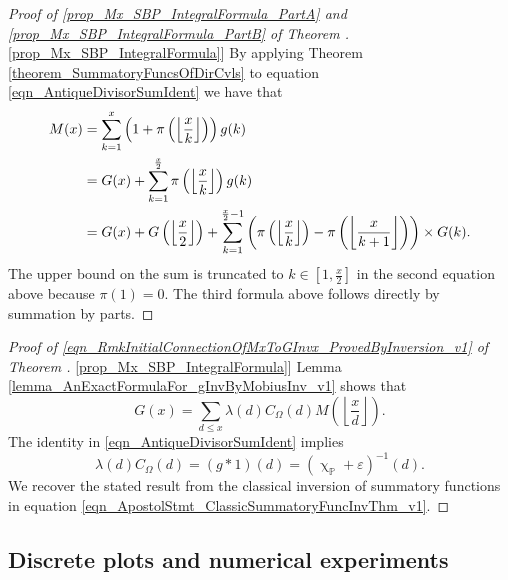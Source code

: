 \documentclass[11pt,reqno,a4letter]{article}
\newcommand{\hlocalref}[1]{\hyperref[#1]{\ref{#1}}}
\numberwithin{equation}{section}
\numberwithin{figure}{section}
\numberwithin{table}{section}
\renewcommand{\chi}{\upchi}
\newcommand{\Floor}[2]{\ensuremath{\left\lfloor \frac{#1}{#2} \right\rfloor}}
\theoremstyle{plain}
\numberwithin{theorem}{section}
\theoremstyle{definition}
\theoremstyle{remark}
\begin{document}
\begin{proof}[Proof of 
              \eqref{prop_Mx_SBP_IntegralFormula_PartA} and \eqref{prop_Mx_SBP_IntegralFormula_PartB} of 
              Theorem \hlocalref{prop_Mx_SBP_IntegralFormula}] 
By applying Theorem \hlocalref{theorem_SummatoryFuncsOfDirCvls} to 
equation \eqref{eqn_AntiqueDivisorSumIdent} we have that 
\begin{align} 
\notag
M(x) & = \sum_{k=1}^{x} \left(1 + \pi\left(\Floor{x}{k}\right)\right) g(k) \\ 
\notag 
     & = G(x) + \sum_{k=1}^{\frac{x}{2}} \pi\left(\Floor{x}{k}\right) g(k) \\ 
\notag 
     & = G(x) + G\left(\Floor{x}{2}\right) + 
     \sum_{k=1}^{\frac{x}{2}-1} \left( 
     \pi\left(\Floor{x}{k}\right) - \pi\left(\Floor{x}{k+1}\right) 
	\right) \times G(k).
\end{align} 
The upper bound on the sum is truncated to $k \in \left[1, \frac{x}{2}\right]$ in the second equation 
above because $\pi(1) = 0$. 
The third formula above follows directly by summation by parts. 
\end{proof} 
\begin{proof}[Proof of \eqref{eqn_RmkInitialConnectionOfMxToGInvx_ProvedByInversion_v1} of 
	      Theorem \hlocalref{prop_Mx_SBP_IntegralFormula}]
Lemma \hlocalref{lemma_AnExactFormulaFor_gInvByMobiusInv_v1} shows that 
\[
G(x) = \sum_{d \leq x} \lambda(d) C_{\Omega}(d) M\left(\Floor{x}{d}\right). 
\]
The identity in \eqref{eqn_AntiqueDivisorSumIdent} implies 
$$\lambda(d) C_{\Omega}(d) = (g \ast 1)(d) = (\chi_{\mathbb{P}} + \varepsilon)^{-1}(d).$$ 
We recover the stated result from the classical inversion of summatory functions in 
equation \eqref{eqn_ApostolStmt_ClassicSummatoryFuncInvThm_v1}. 
\end{proof}

\subsection{Discrete plots and numerical experiments}
\end{document}
